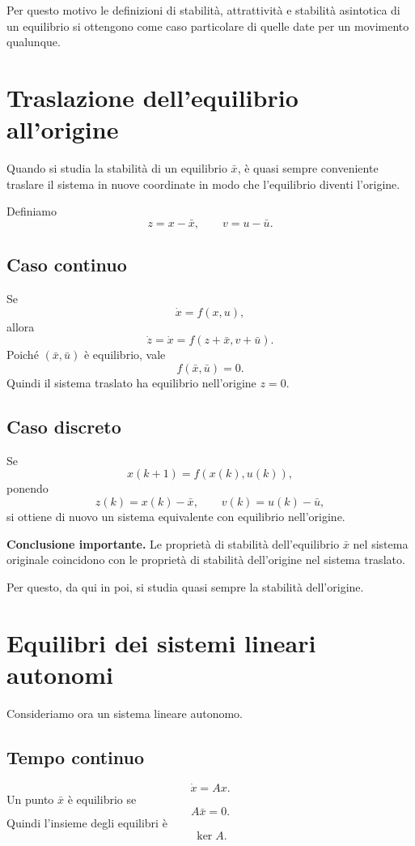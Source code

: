 Per questo motivo le definizioni di stabilità, attrattività e stabilità asintotica di un equilibrio si ottengono come caso particolare di quelle date per un movimento qualunque.

\bigskip

\section{Traslazione dell'equilibrio all'origine}

Quando si studia la stabilità di un equilibrio \(\bar x\), è quasi sempre conveniente traslare il sistema in nuove coordinate in modo che l'equilibrio diventi l'origine.

Definiamo
\[
z=x-\bar x,
\qquad
v=u-\bar u.
\]

\subsection{Caso continuo}
Se
\[
\dot x=f(x,u),
\]
allora
\[
\dot z=\dot x=f(z+\bar x,v+\bar u).
\]
Poiché \((\bar x,\bar u)\) è equilibrio, vale
\[
f(\bar x,\bar u)=0.
\]
Quindi il sistema traslato ha equilibrio nell'origine \(z=0\).

\subsection{Caso discreto}
Se
\[
x(k+1)=f(x(k),u(k)),
\]
ponendo
\[
z(k)=x(k)-\bar x,
\qquad
v(k)=u(k)-\bar u,
\]
si ottiene di nuovo un sistema equivalente con equilibrio nell'origine.

\medskip

\noindent
\textbf{Conclusione importante.}
Le proprietà di stabilità dell'equilibrio \(\bar x\) nel sistema originale coincidono con le proprietà di stabilità dell'origine nel sistema traslato.

Per questo, da qui in poi, si studia quasi sempre la stabilità dell'origine.

\bigskip

\section{Equilibri dei sistemi lineari autonomi}

Consideriamo ora un sistema lineare autonomo.

\subsection{Tempo continuo}
\[
\dot x=Ax.
\]
Un punto \(\bar x\) è equilibrio se
\[
A\bar x=0.
\]
Quindi l'insieme degli equilibri è
\[
\ker A.
\]

